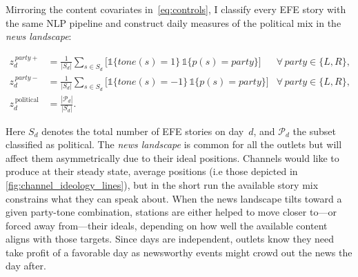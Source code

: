\documentclass[12pt]{article}
\begin{document}
	Mirroring the content covariates in~\eqref{eq:controls}, I classify every EFE story with the same NLP pipeline and construct daily measures of the political mix in the \emph{news landscape}:
	
	\begin{equation}\label{eq:first_stage}
		\begin{aligned}
			z_d^{\,party+} &= \frac{1}{|S_d|}\sum_{s\in S_d}
			\bigl[\mathds{1}\{tone(s)=1\}\,\mathds{1}\{p(s)=\textit{party}\}\bigr]
			&\forall\,\textit{party}\in\{L,R\},\\
			z_d^{\,party-} &= \frac{1}{|S_d|}\sum_{s\in S_d}
			\bigl[\mathds{1}\{tone(s)=-1\}\,\mathds{1}\{p(s)=\textit{party}\}\bigr]
			&\forall\,\textit{party}\in\{L,R\},\\
			z_d^{\,\text{political}} &= \frac{|\mathcal{P}_d|}{|S_d|}.
		\end{aligned}
	\end{equation}
	
	Here $S_d$ denotes the total number of EFE stories on day~$d$, and $\mathcal{P}_d$ the subset classified as political. The \textit{news landscape} is common for all the outlets but will affect them asymmetrically due to their ideal positions. Channels would like to produce at their steady state, average positions (i.e those depicted in \ref{fig:channel_ideology_lines}), but in the short run the available story mix constrains what they can speak about. 
	When the news landscape tilts toward a given party-tone combination, stations are either helped to move closer to—or forced away from—their ideals, depending on how well the available content aligns with those targets. Since days are independent, outlets know they need take profit of a favorable day as newsworthy events might crowd out the news the day after. 
	
	
	
\end{document}
